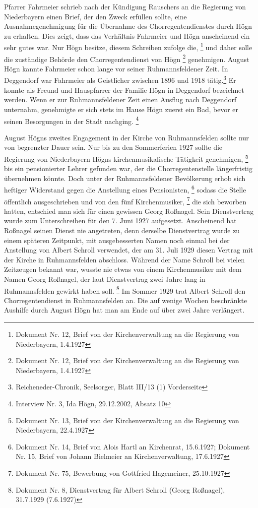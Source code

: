 Pfarrer Fahrmeier schrieb nach der Kündigung Rauschers an die Regierung
von Niederbayern einen Brief, der den Zweck erfüllen sollte, eine
Ausnahmegenehmigung für die Übernahme des Chorregentendienstes durch
Högn zu erhalten. Dies zeigt, dass das Verhältnis Fahrmeier und Högn
anscheinend ein sehr gutes war. Nur Högn besitze, diesem Schreiben
zufolge die, \footnote{
Dokument Nr. 12, Brief von der Kirchenverwaltung an die Regierung von
Niederbayern, 1.4.1927} und daher solle die zuständige Behörde den
Chorregentendienst von Högn  \footnote{Dokument Nr. 12, Brief von der Kirchenverwaltung an die
Regierung von Niederbayern, 1.4.1927} genehmigen. August Högn kannte
Fahrmeier schon lange vor seiner Ruhmannsfeldener Zeit. In Deggendorf
war Fahrmeier als Geistlicher zwischen 1896 und 1918 tätig.\footnote{
Reicheneder-Chronik, Seelsorger, Blatt III/13
(1) Vorderseite} Er konnte als Freund und Hauspfarrer der Familie Högn
in Deggendorf bezeichnet werden. Wenn er zur Ruhmannsfeldener Zeit
einen Ausflug nach Deggendorf unternahm, genehmigte er sich stets im
Hause Högn zuerst ein Bad, bevor er seinen Besorgungen in der Stadt
nachging. \footnote{Interview Nr. 3, Ida Högn, 29.12.2002, Absatz 10}

August Högns zweites Engagement in der Kirche von Ruhmannsfelden sollte
nur von begrenzter Dauer sein. Nur bis zu den Sommerferien 1927 sollte
die Regierung von Niederbayern Högns kirchenmusikalische Tätigkeit
genehmigen, \footnote{Dokument Nr. 13, Brief von der Kirchenverwaltung
an die Regierung von Niederbayern, 22.4.1927} bis ein pensionierter
Lehrer gefunden war, der die Chorregentenstelle längerfristig
übernehmen könnte. Doch unter der Ruhmannsfeldener Bevölkerung erhob
sich heftiger Widerstand gegen die Anstellung eines
Pensionisten, \footnote{Dokument Nr. 14, Brief von Alois Hartl an
Kirchenrat, 15.6.1927; Dokument Nr. 15, Brief von Johann Bielmeier an
Kirchenverwaltung, 17.6.1927} sodass die Stelle öffentlich
ausgeschrieben und von den fünf Kirchenmusiker, \footnote{Dokument Nr.
75, Bewerbung von Gottfried Hagemeiner, 25.10.1927} die sich beworben
hatten, entschied man sich für einen gewissen Georg Roßnagel. Sein
Dienstvertrag wurde zum Unterschreiben für den 7. Juni 1927 aufgesetzt.
Anscheinend hat Roßnagel seinen Dienst nie angetreten, denn derselbe
Dienstvertrag wurde zu einem späteren Zeitpunkt, mit ausgebesserten
Namen noch einmal bei der Anstellung von Albert Schroll verwendet, der
am 31. Juli 1929 diesen Vertrag mit der Kirche in Ruhmannsfelden
abschloss. Während der Name Schroll bei vielen Zeitzeugen bekannt war,
wusste nie etwas von einem Kirchenmusiker mit dem Namen Georg Roßnagel,
der laut Dienstvertrag zwei Jahre lang in Ruhmannsfelden gewirkt haben
soll. \footnote{Dokument Nr. 8, Dienstvertrag für Albert Schroll (Georg
Roßnagel), 31.7.1929 (7.6.1927)} Im Sommer 1929 trat Albert Schroll den
Chorregentendienst in Ruhmannsfelden an. Die auf wenige Wochen
beschränkte Aushilfe durch August Högn hat man am Ende auf über zwei
Jahre verlängert.

